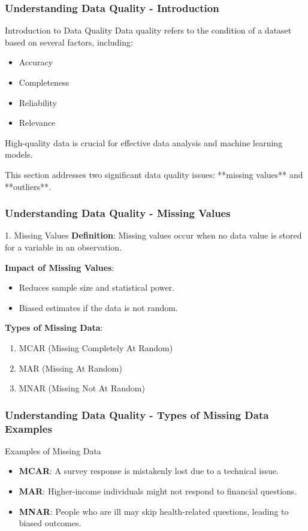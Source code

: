 \documentclass[aspectratio=169]{beamer}
\begin{document}
\begin{frame}[fragile]
    \frametitle{Understanding Data Quality - Introduction}
    \begin{block}{Introduction to Data Quality}
        Data quality refers to the condition of a dataset based on several factors, including:
        \begin{itemize}
            \item Accuracy
            \item Completeness
            \item Reliability
            \item Relevance
        \end{itemize}
        High-quality data is crucial for effective data analysis and machine learning models.
    \end{block}
    This section addresses two significant data quality issues: **missing values** and **outliers**.
\end{frame}

\begin{frame}[fragile]
    \frametitle{Understanding Data Quality - Missing Values}
    \begin{block}{1. Missing Values}
        \textbf{Definition}: Missing values occur when no data value is stored for a variable in an observation. 

        \textbf{Impact of Missing Values}:
        \begin{itemize}
            \item Reduces sample size and statistical power.
            \item Biased estimates if the data is not random.
        \end{itemize}

        \textbf{Types of Missing Data}:
        \begin{enumerate}
            \item MCAR (Missing Completely At Random)
            \item MAR (Missing At Random)
            \item MNAR (Missing Not At Random)
        \end{enumerate}
    \end{block}
\end{frame}

\begin{frame}[fragile]
    \frametitle{Understanding Data Quality - Types of Missing Data Examples}
    \begin{block}{Examples of Missing Data}
        \begin{itemize}
            \item \textbf{MCAR}: A survey response is mistakenly lost due to a technical issue.
            \item \textbf{MAR}: Higher-income individuals might not respond to financial questions.
            \item \textbf{MNAR}: People who are ill may skip health-related questions, leading to biased outcomes.
        \end{itemize}
    \end{block}
\end{frame}
\end{document}
